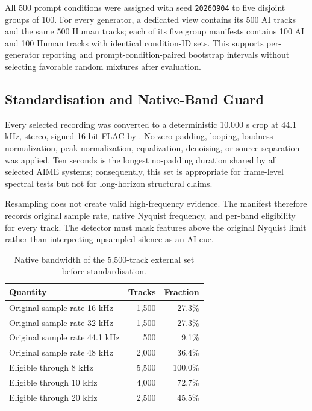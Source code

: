 All 500 prompt conditions were assigned with seed \texttt{20260904} to five
disjoint groups of 100. For every generator, a dedicated view contains its 500
AI tracks and the same 500 Human tracks; each of its five group manifests
contains 100 AI and 100 Human tracks with identical condition-ID sets. This
supports per-generator reporting and prompt-condition-paired bootstrap
intervals without selecting favorable random mixtures after evaluation.

\subsection{Standardisation and Native-Band Guard}

Every selected recording was converted to a deterministic 10.000 s crop at
44.1 kHz, stereo, signed 16-bit FLAC by . No zero-padding,
looping, loudness normalization, peak normalization, equalization, denoising,
or source separation was applied. Ten seconds is the longest no-padding
duration shared by all selected AIME systems; consequently, this set is
appropriate for frame-level spectral tests but not for long-horizon structural
claims.

Resampling does not create valid high-frequency evidence. The manifest therefore
records original sample rate, native Nyquist frequency, and per-band eligibility
for every track. The detector must mask features above the original Nyquist
limit rather than interpreting upsampled silence as an AI cue.

\begin{table}[H]
\centering
\caption{Native bandwidth of the 5,500-track external set before standardisation.}
\label{tab:external-native-bandwidth}
\begin{tabular}{lrr}
\toprule
Quantity & Tracks & Fraction \\
\midrule
Original sample rate 16 kHz & 1,500 & 27.3\% \\
Original sample rate 32 kHz & 1,500 & 27.3\% \\
Original sample rate 44.1 kHz & 500 & 9.1\% \\
Original sample rate 48 kHz & 2,000 & 36.4\% \\
Eligible through 8 kHz & 5,500 & 100.0\% \\
Eligible through 10 kHz & 4,000 & 72.7\% \\
Eligible through 20 kHz & 2,500 & 45.5\% \\
\bottomrule
\end{tabular}
\end{table}

